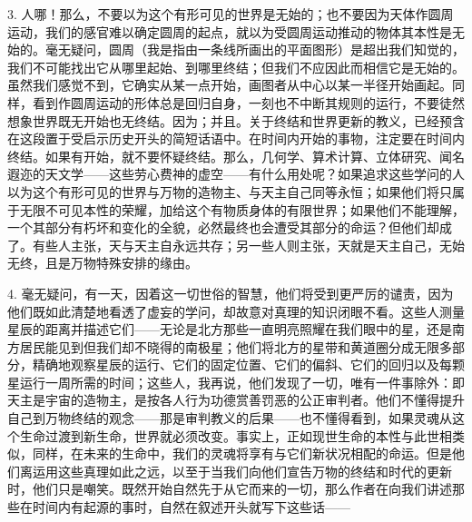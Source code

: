 3. 人哪！那么，不要以为这个有形可见的世界是无始的；也不要因为天体作圆周运动，我们的感官难以确定圆周的起点，就以为受圆周运动推动的物体其本性是无始的。毫无疑问，圆周（我是指由一条线所画出的平面图形）是超出我们知觉的，我们不可能找出它从哪里起始、到哪里终结；但我们不应因此而相信它是无始的。虽然我们感觉不到，它确实从某一点开始，画图者从中心以某一半径开始画起。同样，看到作圆周运动的形体总是回归自身，一刻也不中断其规则的运行，不要徒然想象世界既无开始也无终结。因为；并且。关于终结和世界更新的教义，已经预含在这段置于受启示历史开头的简短话语中。在时间内开始的事物，注定要在时间内终结。如果有开始，就不要怀疑终结。那么，几何学、算术计算、立体研究、闻名遐迩的天文学——这些劳心费神的虚空——有什么用处呢？如果追求这些学问的人以为这个有形可见的世界与万物的造物主、与天主自己同等永恒；如果他们将只属于无限不可见本性的荣耀，加给这个有物质身体的有限世界；如果他们不能理解，一个其部分有朽坏和变化的全貌，必然最终也会遭受其部分的命运？但他们却成了。有些人主张，天与天主自永远共存；另一些人则主张，天就是天主自己，无始无终，且是万物特殊安排的缘由。\par

4. 毫无疑问，有一天，因着这一切世俗的智慧，他们将受到更严厉的谴责，因为他们既如此清楚地看透了虚妄的学问，却故意对真理的知识闭眼不看。这些人测量星辰的距离并描述它们——无论是北方那些一直明亮照耀在我们眼中的星，还是南方居民能见到但我们却不晓得的南极星；他们将北方的星带和黄道圈分成无限多部分，精确地观察星辰的运行、它们的固定位置、它们的偏斜、它们的回归以及每颗星运行一周所需的时间；这些人，我再说，他们发现了一切，唯有一件事除外：即天主是宇宙的造物主，是按各人行为功德赏善罚恶的公正审判者。他们不懂得提升自己到万物终结的观念——那是审判教义的后果——也不懂得看到，如果灵魂从这个生命过渡到新生命，世界就必须改变。事实上，正如现世生命的本性与此世相类似，同样，在未来的生命中，我们的灵魂将享有与它们新状况相配的命运。但是他们离运用这些真理如此之远，以至于当我们向他们宣告万物的终结和时代的更新时，他们只是嘲笑。既然开始自然先于从它而来的一切，那么作者在向我们讲述那些在时间内有起源的事时，自然在叙述开头就写下这些话——\par


